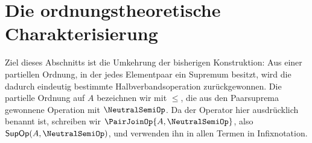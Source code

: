 \documentclass[main.tex]{subfiles}
\begin{document}
\section{Die ordnungstheoretische Charakterisierung}

Ziel dieses Abschnitts ist die Umkehrung der bisherigen Konstruktion: Aus
einer partiellen Ordnung, in der jedes Elementpaar ein Supremum besitzt, wird
die dadurch eindeutig bestimmte Halbverbandsoperation zurückgewonnen. Die
partielle Ordnung auf \(A\) bezeichnen wir mit \(\leq\), die aus den
Paarsuprema gewonnene Operation mit \(\NeutralSemiOp\). Da der Operator hier
ausdrücklich benannt ist, schreiben wir
\(\PairJoinOp{A,\NeutralSemiOp}\), also
\(\mathsf{SupOp}(A,\NeutralSemiOp)\), und verwenden ihn in allen Termen in
Infixnotation.

\par\smallskip

\par\smallskip

\end{document}
